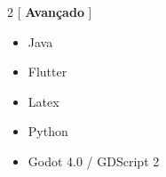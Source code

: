 \documentclass[10pt,a4paper,ragged2e]{altacv}
\begin{document}
\begin{multicols}{2}
[
\textbf{ \Large Avançado}
\vspace{-7pt}
]
\begin{itemize}
    \item Java
    \item Flutter
    \item Latex
\end{itemize}
\begin{itemize}
    \item Python
    \item Godot 4.0 / GDScript 2
\end{itemize}
\end{multicols}






\clearpage







\end{document}
